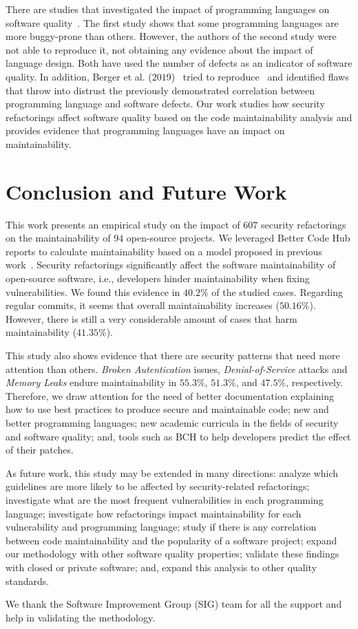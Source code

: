 \documentclass[sigconf,review]{acmart}
\begin{document}
There are studies that investigated the impact of programming languages on software
quality~\cite{Ray:2014:LSS:2635868.2635922,Ray:2017:LSP:3144574.3126905}. The first
study shows that some programming languages are more buggy-prone than others. However,
the authors of the second study were not able to reproduce it, not obtaining any
evidence about the impact of language design. Both have used the number of
defects as an indicator of software quality. In addition,
Berger et al. ($2019$)~\cite{2019arXiv190110220B} tried to reproduce~\cite{Ray:2014:LSS:2635868.2635922,
Ray:2017:LSP:3144574.3126905} and identified flaws that throw into distrust the previously demonstrated
correlation between programming language and software defects. Our work studies how
security refactorings affect software quality based on the code maintainability
analysis and provides evidence that programming languages have an impact on
maintainability.

\section{Conclusion and Future Work}\label{sec:conclusions}

This work presents an empirical study on the impact of $607$ security
refactorings on the maintainability of $94$ open-source projects. We leveraged
Better Code Hub reports to calculate maintainability based on a model proposed in previous work~\cite{Olivari:2018}. Security refactorings 
significantly affect the software maintainability of open-source software, i.e., 
developers hinder maintainability when fixing vulnerabilities. We found this evidence in
$40.2\%$ of the studied cases. Regarding regular commits, it seems that overall
maintainability increases ($50.16\%$). However, there is still a very
considerable amount of cases that harm maintainability ($41.35\%$).

This study also shows evidence that there are security patterns that need more
attention than others. \emph{Broken Autentication} issues,
\emph{Denial-of-Service} attacks and \emph{Memory Leaks} endure maintainability
in $55.3\%$, $51.3\%$, and $47.5\%$, respectively. Therefore, we draw attention
for the need of better documentation explaining how to use best practices to
produce secure and maintainable code; new and better programming languages; new
academic curricula in the fields of security and software quality; and, tools
such as BCH to help developers predict the effect of their patches.

As future work, this study may be extended in many directions: analyze which
guidelines are more likely to be affected by security-related refactorings;
investigate what are the most frequent vulnerabilities in each programming
language; investigate how refactorings impact maintainability for each
vulnerability and programming language;
study if there is any correlation between code maintainability and
the popularity of a software project; expand our methodology with other
software quality properties; validate these findings with closed or private
software; and, expand this analysis to other quality standards.

\begin{acks}
We thank the Software Improvement Group (SIG) team for all the support and
help in validating the methodology.
\end{acks}



\end{document}
